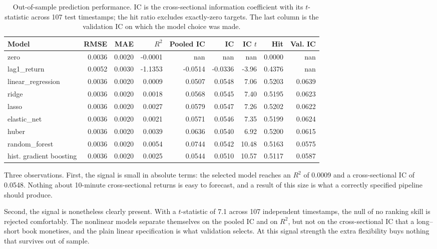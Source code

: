 \documentclass[11pt]{article}
\begin{document}
\begin{table}[!htbp]
\centering
\small
\caption{Out-of-sample prediction performance. IC is the cross-sectional
information coefficient with its $t$-statistic across 107 test
timestamps; the hit ratio excludes exactly-zero targets. The last column is the
validation IC on which the model choice was made.}
\label{tab:prediction}
\begin{tabular}{lrrrrrrrr}
\toprule
Model & RMSE & MAE & $R^2$ & Pooled IC & IC & IC $t$ & Hit & Val. IC \\
\midrule
zero & 0.0036 & 0.0020 & -0.0001 & nan & nan & nan & 0.0000 & nan \\
lag1\_return & 0.0052 & 0.0030 & -1.1353 & -0.0514 & -0.0336 & -3.96 & 0.4376 & nan \\
linear\_regression & 0.0036 & 0.0020 & 0.0009 & 0.0507 & 0.0548 & 7.06 & 0.5203 & 0.0639 \\
ridge & 0.0036 & 0.0020 & 0.0018 & 0.0568 & 0.0545 & 7.40 & 0.5195 & 0.0623 \\
lasso & 0.0036 & 0.0020 & 0.0027 & 0.0579 & 0.0547 & 7.26 & 0.5202 & 0.0622 \\
elastic\_net & 0.0036 & 0.0020 & 0.0021 & 0.0571 & 0.0546 & 7.35 & 0.5199 & 0.0624 \\
huber & 0.0036 & 0.0020 & 0.0039 & 0.0636 & 0.0540 & 6.92 & 0.5200 & 0.0615 \\
random\_forest & 0.0036 & 0.0020 & 0.0054 & 0.0744 & 0.0542 & 10.48 & 0.5163 & 0.0575 \\
hist. gradient boosting & 0.0036 & 0.0020 & 0.0025 & 0.0544 & 0.0510 & 10.57 & 0.5117 & 0.0587 \\
\bottomrule
\end{tabular}
\end{table}

Three observations. First, the signal is small in absolute terms: the selected
model reaches an $R^2$ of 0.0009 and a cross-sectional IC of 0.0548. Nothing about
10-minute cross-sectional returns is easy to forecast, and a result of this size
is what a correctly specified pipeline should produce.

Second, the signal is nonetheless clearly present. With a $t$-statistic of
7.1 across 107 independent timestamps, the null of no ranking skill
is rejected comfortably. The nonlinear models separate themselves on the pooled IC and on
$R^2$, but not on the cross-sectional IC that a long--short book monetises, and
the plain linear specification is what validation selects. At this signal
strength the extra flexibility buys nothing that survives out of sample.
\end{document}
